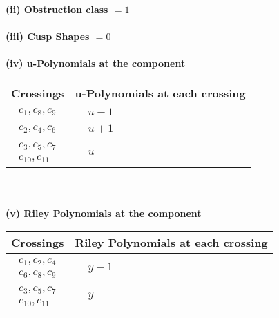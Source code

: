 \documentclass[1p]{elsarticle_modified}
\theoremstyle{definition}
\begin{document}
\flushleft \textbf{(ii) Obstruction class $= 1$}\\~\\
\flushleft \textbf{(iii) Cusp Shapes $= 0$}\\~\\
\newpage\renewcommand{\arraystretch}{1}
\flushleft \textbf{(iv) u-Polynomials at the component}\newline \\
\begin{tabular}{m{50pt}|m{274pt}}
Crossings & \hspace{64pt}u-Polynomials at each crossing \\
\hline $$\begin{aligned}c_{1},c_{8},c_{9}\end{aligned}$$&$\begin{aligned}
&u-1
\end{aligned}$\\
\hline $$\begin{aligned}c_{2},c_{4},c_{6}\end{aligned}$$&$\begin{aligned}
&u+1
\end{aligned}$\\
\hline $$\begin{aligned}c_{3},c_{5},c_{7}\\c_{10},c_{11}\end{aligned}$$&$\begin{aligned}
&u
\end{aligned}$\\
\hline
\end{tabular}\\~\\
\newpage\renewcommand{\arraystretch}{1}
\flushleft \textbf{(v) Riley Polynomials at the component}\newline \\
\begin{tabular}{m{50pt}|m{274pt}}
Crossings & \hspace{64pt}Riley Polynomials at each crossing \\
\hline $$\begin{aligned}c_{1},c_{2},c_{4}\\c_{6},c_{8},c_{9}\end{aligned}$$&$\begin{aligned}
&y-1
\end{aligned}$\\
\hline $$\begin{aligned}c_{3},c_{5},c_{7}\\c_{10},c_{11}\end{aligned}$$&$\begin{aligned}
&y
\end{aligned}$\\
\hline
\end{tabular}\\~\\
\end{document}
